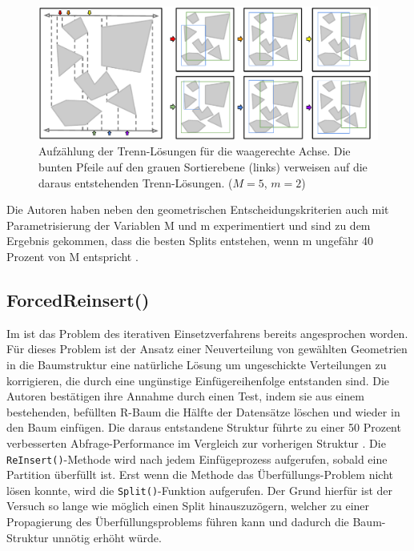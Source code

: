 \documentclass[runningheads,a4paper]{llncs}
\begin{document}
	\begin{figure}[h]
		\centering
		\includegraphics[width=1\textwidth]{006_Beispiel_Trenn_Loesungen.pdf}
		\caption{Aufzählung der Trenn-Lösungen für die waagerechte Achse. Die bunten Pfeile auf den grauen Sortierebene (links) verweisen auf die daraus entstehenden Trenn-Lösungen. ($M=5$, $m=2$)}
		\label{fig:beispiel-trenn-loesungen}
	\end{figure}

	Die Autoren haben neben den geometrischen Entscheidungskriterien auch mit Parametrisierung der Variablen \acs{M} und \acs{m} experimentiert und sind zu dem Ergebnis gekommen, dass die besten Splits entstehen, wenn \acs{m} ungefähr 40 Prozent von \acs{M} entspricht \citep[vgl.][328]{Beckmann:1990}.

	\subsection{ForcedReinsert()}
	\label{sec:rstar_reinsert}

	Im  ist das Problem des iterativen Einsetzverfahrens bereits angesprochen worden. Für dieses Problem ist der Ansatz einer Neuverteilung von gewählten Geometrien in die Baumstruktur eine natürliche Lösung um ungeschickte Verteilungen zu korrigieren, die durch eine ungünstige Einfügereihenfolge entstanden sind. Die Autoren bestätigen ihre Annahme durch einen Test, indem sie aus einem bestehenden, befüllten R-Baum die Hälfte der Datensätze löschen und wieder in den Baum einfügen. Die daraus entstandene Struktur führte zu einer 50 Prozent verbesserten Abfrage-Performance im Vergleich zur vorherigen Struktur \citep[vgl.][]{Beckmann:1990}. Die \texttt{ReInsert()}-Methode wird nach jedem Einfügeprozess aufgerufen, sobald eine Partition überfüllt ist. Erst wenn die Methode das Überfüllungs-Problem nicht lösen konnte, wird die \texttt{Split()}-Funktion aufgerufen. Der Grund hierfür ist der Versuch so lange wie möglich einen Split hinauszuzögern, welcher zu einer Propagierung des Überfüllungsproblems führen kann und dadurch die Baum-Struktur unnötig erhöht würde.
\end{document}
